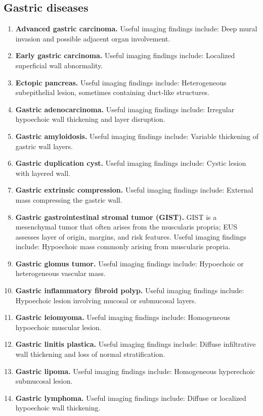 \subsection{Gastric diseases}
\begin{enumerate}[leftmargin=*,itemsep=0.45em,topsep=0.4em]
\item \textbf{Advanced gastric carcinoma.} Useful imaging findings include: Deep mural invasion and possible adjacent organ involvement.
\item \textbf{Early gastric carcinoma.} Useful imaging findings include: Localized superficial wall abnormality.
\item \textbf{Ectopic pancreas.} Useful imaging findings include: Heterogeneous subepithelial lesion, sometimes containing duct-like structures.
\item \textbf{Gastric adenocarcinoma.} Useful imaging findings include: Irregular hypoechoic wall thickening and layer disruption.
\item \textbf{Gastric amyloidosis.} Useful imaging findings include: Variable thickening of gastric wall layers.
\item \textbf{Gastric duplication cyst.} Useful imaging findings include: Cystic lesion with layered wall.
\item \textbf{Gastric extrinsic compression.} Useful imaging findings include: External mass compressing the gastric wall.
\item \textbf{Gastric gastrointestinal stromal tumor (GIST).} GIST is a mesenchymal tumor that often arises from the muscularis propria; EUS assesses layer of origin, margins, and risk features. Useful imaging findings include: Hypoechoic mass commonly arising from muscularis propria.
\item \textbf{Gastric glomus tumor.} Useful imaging findings include: Hypoechoic or heterogeneous vascular mass.
\item \textbf{Gastric inflammatory fibroid polyp.} Useful imaging findings include: Hypoechoic lesion involving mucosal or submucosal layers.
\item \textbf{Gastric leiomyoma.} Useful imaging findings include: Homogeneous hypoechoic muscular lesion.
\item \textbf{Gastric linitis plastica.} Useful imaging findings include: Diffuse infiltrative wall thickening and loss of normal stratification.
\item \textbf{Gastric lipoma.} Useful imaging findings include: Homogeneous hyperechoic submucosal lesion.
\item \textbf{Gastric lymphoma.} Useful imaging findings include: Diffuse or localized hypoechoic wall thickening.

\end{enumerate}
